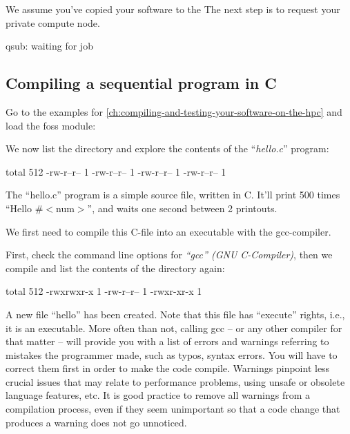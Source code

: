We assume you've copied your software to the \hpc The next step is to request your private compute node.
\begin{prompt}
qsub: waiting for job %
\end{prompt}

\subsection{Compiling a sequential program in C}

Go to the examples for
\autoref{ch:compiling-and-testing-your-software-on-the-hpc} and load the foss
module:
\begin{prompt}
\end{prompt}

We now list the directory and explore the contents of the ``\emph{hello.c}''
program:

\begin{prompt}
total 512
-rw-r--r-- 1 %
-rw-r--r-- 1 %
-rw-r--r-- 1 %
-rw-r--r-- 1 %
\end{prompt}


The ``hello.c'' program is a simple source file, written in C. It'll print 500
times ``Hello \#$<$num$>$'', and waits one second between 2 printouts.

We first need to compile this C-file into an executable with the gcc-compiler.

First, check the command line options for \emph{``gcc'' (GNU C-Compiler)},
then we compile and list the contents of the directory again:

\begin{prompt}
total 512
-rwxrwxr-x 1 %
-rw-r--r-- 1 %
-rwxr-xr-x 1 %
\end{prompt}

A new file ``hello'' has been created. Note that this file has ``execute''
rights, i.e., it is an executable. More often than not, calling gcc -- or any
other compiler for that matter -- will provide you with a list of errors and
warnings referring to mistakes the programmer made, such as typos, syntax
errors. You will have to correct them first in order to make the code compile.
Warnings pinpoint less crucial issues that may relate to performance problems,
using unsafe or obsolete language features, etc. It is good practice to remove
all warnings from a compilation process, even if they seem unimportant so that
a code change that produces a warning does not go unnoticed.

